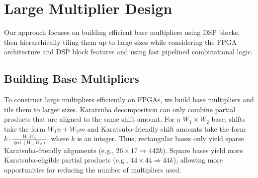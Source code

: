 \documentclass[sigconf,9pt,review]{acmart}
\begin{document}


% 




\section{Large Multiplier Design} \label{sec_large_mult_design}
Our approach focuses on building efficient base multipliers using DSP blocks, then hierarchically tiling them up to large sizes while considering the FPGA architecture and DSP block features and using fast pipelined combinational logic.
 
\subsection{Building Base Multipliers} \label{sec_build_base_mult}


To construct large multipliers efficiently on FPGAs, we build base multipliers and tile them to larger sizes.
Karatsuba decomposition can only combine partial products that are aligned to the same shift amount.
For a $W_1\times W_2$ base, shifts take the form $W_1 n + W_2 m$ and Karatsuba-friendly shift amounts take the form $k\cdot\frac{W_1 W_2}{\gcd(W_1, W_2)}$, where $k$ is an integer.
Thus, rectangular bases only yield sparse Karatsuba-friendly alignments (e.g., $26\times17\Rightarrow 442k$).
Square bases yield more Karatsuba-eligible partial products (e.g., $44\times44\Rightarrow 44k$), allowing more opportunities for reducing the number of multipliers used.
\end{document}
